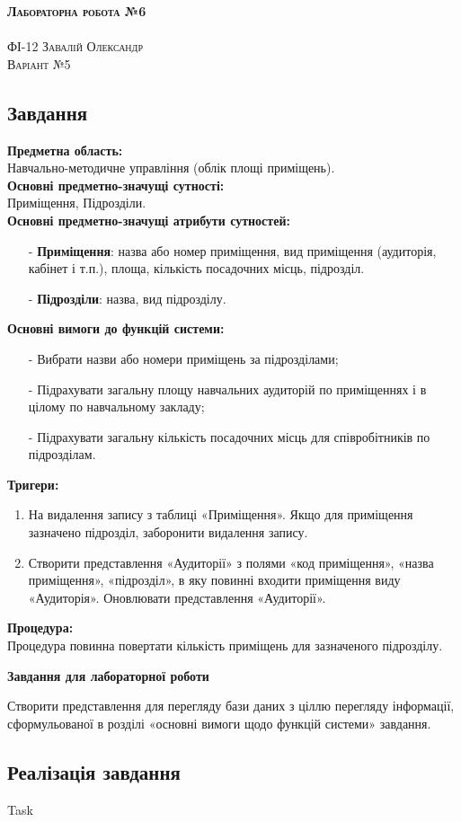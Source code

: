 \documentclass[a4paper,12pt]{article}
\newcommand{\RomanNumeralCaps}[1]{\MakeUppercase{\romannumeral #1}}
\begin{document}
	
	\begin{center}
		{\Large \bfseries \textsc{Лабораторна робота №6}}\\
		\hrulefill\\
		\Large \textsc{ФІ-12 Завалій Олександр\\ Варіант №5}
	\end{center}
	\begin{center}
		\section*{\bfseries{Завдання}}
	\end{center} 
	\textbf{Предметна область:} \\
	Навчально-методичне управління (облік площі приміщень). \\
	\textbf{Основні предметно-значущі сутності:} \\
	Приміщення, Підрозділи. \\
	\textbf{Основні предметно-значущі атрибути сутностей:}
	\begin{enumerate}
		\item[-] \textbf{Приміщення}: назва або номер приміщення, вид приміщення (аудиторія, кабінет і т.п.), площа, кількість посадочних місць, підрозділ. 
		\item[-] \textbf{Підрозділи}: назва, вид підрозділу.
	\end{enumerate}
	\textbf{Основні вимоги до функцій системи:}
	\begin{enumerate}
		\item[-] Вибрати назви або номери приміщень за підрозділами;
		\item[-] Підрахувати загальну площу навчальних аудиторій по приміщеннях і в цілому по навчальному закладу;
		\item[-] Підрахувати загальну кількість посадочних місць для співробітників по підрозділам.
	\end{enumerate}
	\textbf{Тригери:}
	\begin{enumerate}
		\item На видалення запису з таблиці «Приміщення». Якщо для приміщення зазначено підрозділ, заборонити видалення запису.
		\item Створити представлення «Аудиторії» з полями «код приміщення», «назва приміщення», «підрозділ», в яку повинні входити приміщення виду «Аудиторія». Оновлювати представлення «Аудиторії».
	\end{enumerate}
	\textbf{Процедура:}\\
	Процедура повинна повертати кількість приміщень для зазначеного підрозділу. \\
	\begin{center}
		\textbf{Завдання для лабораторної роботи}
	\end{center}
    Створити представлення для перегляду бази даних з ціллю перегляду інформації,
	сформульованої в розділі «основні вимоги щодо функцій системи» завдання.

\newpage
	\begin{center}
		\section*{\bfseries{Реалізація завдання}}
	\end{center}
    \begin{center}
        \Large{Task \RomanNumeralCaps{1}}
    \end{center}
\end{document}
